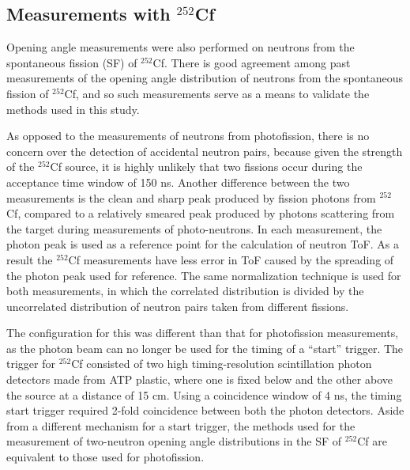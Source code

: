 \subsection{Measurements with $^{252}$Cf}

Opening angle measurements were also performed on neutrons from the spontaneous fission (SF) of $^{252}$Cf.
There is good agreement among past measurements of the opening angle distribution of neutrons from the spontaneous fission of $^{252}$Cf, and so such measurements serve as a means to validate the methods used in this study.

As opposed to the measurements of neutrons from photofission, there is no concern over the detection of accidental neutron pairs, because given the strength of the $^{252}$Cf source, it is highly unlikely that two fissions occur during the acceptance time window of 150 ns.
Another difference between the two measurements is the clean and sharp peak produced by fission photons from $^{252}$Cf, compared to a relatively smeared peak produced by photons scattering from the target during measurements of photo-neutrons.
In each measurement, the photon peak is used as a reference point for the calculation of neutron ToF.
As a result the $^{252}$Cf measurements have less error in ToF caused by the spreading of the photon peak used for reference.
The same normalization technique is used for both measurements, in which the correlated distribution is divided by the uncorrelated distribution of neutron pairs taken from different fissions.

The configuration for this was different than that for photofission measurements, as the photon beam can no longer be used for the timing of a ``start'' trigger.
The trigger for $^{252}$Cf consisted of two high timing-resolution scintillation photon detectors made from ATP plastic, where one is fixed below and the other above the source at a distance of 15 cm.
Using a coincidence window of 4 ns, the timing start trigger required 2-fold coincidence between both the photon detectors.
Aside from a different mechanism for a start trigger, the methods used for the measurement of two-neutron opening angle distributions in the SF of $^{252}$Cf are equivalent to those used for photofission.


